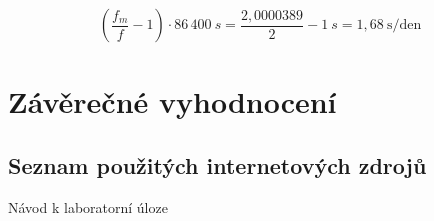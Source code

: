 \documentclass[a4paper,12pt]{article}   %
\begin{document}
\begin{equation}
  \left(\frac{f_m}{f}-1\right)\cdot 86\,400~s = \frac{2,0000389}{2}-1~s = 1,68~\textrm{s/den}
  \label{eq:presnost_T}
\end{equation}

\section{Závěrečné vyhodnocení}


\clearpage
\renewcommand{\refname}{Seznam použité literatury a~zdrojů informací} 

\begin{thebibliography}{99}

\subsection*{Seznam použitých internetových zdrojů}
     Návod k laboratorní úloze
    
\end{thebibliography}
\end{document}

